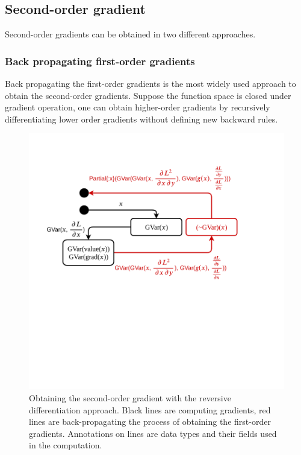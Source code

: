 \documentclass[aps,twocolumn,longbibliography,english,superscriptaddress]{revtex4-1}
\newcommand{\<}{\langle}
\renewcommand{\>}{\rangle}
\theoremstyle{definition}\newtheorem{definition}{\textit{Definition}}
\begin{document}
\subsection{Second-order gradient}
Second-order gradients can be obtained in two different approaches.
\subsubsection{Back propagating first-order gradients}\label{sec:simplehessian}
Back propagating the first-order gradients is the most widely used approach to obtain the second-order gradients. Suppose the function space is closed under gradient operation, one can obtain higher-order gradients by recursively differentiating lower order gradients without defining new backward rules.
\begin{figure}[h]
    \centerline{\includegraphics[width=\columnwidth,trim={0 6.5cm 1cm 2cm},clip]{images/simplehessian.pdf}}
    \caption{Obtaining the second-order gradient with the reversive differentiation approach. Black lines are computing gradients, red lines are back-propagating the process of obtaining the first-order gradients. Annotations on lines are data types and their fields used in the computation.}\label{fig:simplehessian}
\end{figure}
\end{document}

